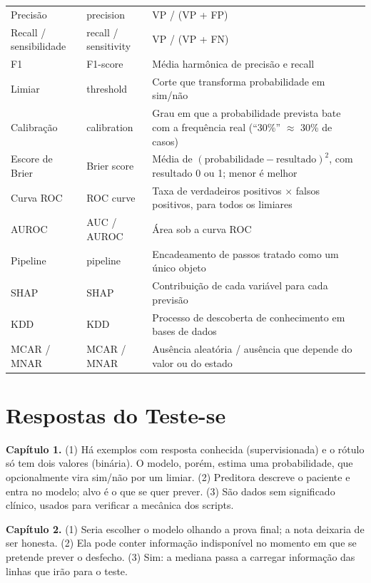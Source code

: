 \documentclass[11pt,a4paper]{article}
\begin{document}
\begin{center}
\begin{longtable}{@{}p{3.6cm}p{3.6cm}p{7.2cm}@{}}
Precisão & precision & VP / (VP + FP) \\
Recall / sensibilidade & recall / sensitivity & VP / (VP + FN) \\
F1 & F1-score & Média harmônica de precisão e recall \\
Limiar & threshold & Corte que transforma probabilidade em sim/não \\
Calibração & calibration & Grau em que a probabilidade prevista bate com a frequência real (``30\%'' $\approx$ 30\% de casos) \\
Escore de Brier & Brier score & Média de $(\text{probabilidade}-\text{resultado})^2$, com resultado 0 ou 1; menor é melhor \\
Curva ROC & ROC curve & Taxa de verdadeiros positivos $\times$ falsos positivos, para todos os limiares \\
AUROC & AUC / AUROC & Área sob a curva ROC \\
Pipeline & pipeline & Encadeamento de passos tratado como um único objeto \\
SHAP & SHAP & Contribuição de cada variável para cada previsão \\
KDD & KDD & Processo de descoberta de conhecimento em bases de dados \\
MCAR / MNAR & MCAR / MNAR & Ausência aleatória / ausência que depende do valor ou do estado \\
\bottomrule
\end{longtable}
\end{center}

\section{Respostas do Teste-se}

\textbf{Capítulo 1.}
(1) Há exemplos com resposta conhecida (supervisionada) e o rótulo só tem dois valores (binária). O modelo, porém, estima uma probabilidade, que opcionalmente vira sim/não por um limiar.
(2) Preditora descreve o paciente e entra no modelo; alvo é o que se quer prever.
(3) São dados sem significado clínico, usados para verificar a mecânica dos scripts.

\textbf{Capítulo 2.}
(1) Seria escolher o modelo olhando a prova final; a nota deixaria de ser honesta.
(2) Ela pode conter informação indisponível no momento em que se pretende prever o desfecho.
(3) Sim: a mediana passa a carregar informação das linhas que irão para o teste.
\end{document}
